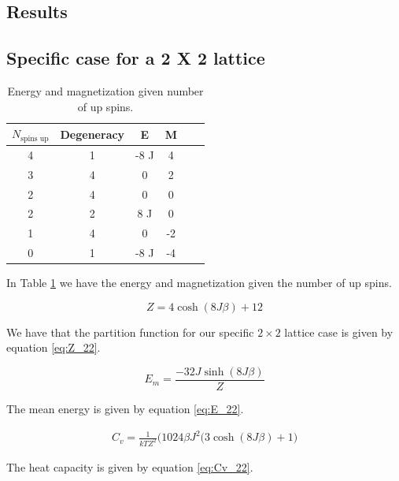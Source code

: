 \documentclass{article}
\begin{document}
\begin{multicols}{2}
\section{Results}

\subsection*{Specific case for a 2 X 2 lattice}

\begin{table}[H]
\begin{center}
\caption{Energy and magnetization given number of up spins.}
\begin{tabular}{  |c|c|c|c|c|c| } \hline
$N_{\text{spins up}}$&Degeneracy&E&M \\ \hline
4&1&-8 J&4\\ \hline
3&4&0 &2 \\ \hline
2&4&0&0\\ \hline
2&2&8 J&0\\ \hline
1&4&0&-2\\ \hline
0&1&-8 J&-4\\ \hline
\end{tabular}
\label{tab:up_spins}
\end{center}
\end{table}

In Table \ref{tab:up_spins} we have the energy and magnetization given the number of up spins. 

\begin{equation}
Z=4\cosh{(8J\beta)}+12
\label{eq:Z_22}
\end{equation}

We have that the partition function for our specific $2\times2$ lattice case is given by equation \ref{eq:Z_22}.

\begin{equation}
E_m=\frac{-32J\sinh{(8J\beta)}}{Z}
\label{eq:E_22}
\end{equation}

The mean energy is given by equation \ref{eq:E_22}.

\begin{equation}
\begin{split}
C_v = \frac{1}{kTZ^2} \bigg(1024\beta J^2(3\cosh(8J\beta) + 1\bigg)
\end{split}
\label{eq:Cv_22}
\end{equation}

The heat capacity is given by equation \ref{eq:Cv_22}.


\end{multicols}
\end{document}
